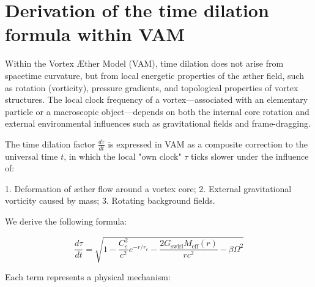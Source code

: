 \section{Derivation of the time dilation formula within VAM}

Within the Vortex Æther Model (VAM), time dilation does not arise from spacetime curvature, but from local energetic properties of the æther field, such as rotation (vorticity), pressure gradients, and topological properties of vortex structures. The local clock frequency of a vortex—associated with an elementary particle or a macroscopic object—depends on both the internal core rotation and external environmental influences such as gravitational fields and frame-dragging.

The time dilation factor $\frac{d\tau}{dt}$ is expressed in VAM as a composite correction to the universal time $t$, in which the local "own clock" $\tau$ ticks slower under the influence of:

1. Deformation of æther flow around a vortex core;
2. External gravitational vorticity caused by mass;
3. Rotating background fields.

We derive the following formula:

\begin{equation}
  \frac{d\tau}{dt} = \sqrt{1 - \frac{C_e^2}{c^2} e^{-r/r_c} - \frac{2G_{\text{swirl}} M_{\text{eff}}(r)}{r c^2} - \beta \Omega^2}
\end{equation}

Each term represents a physical mechanism:

